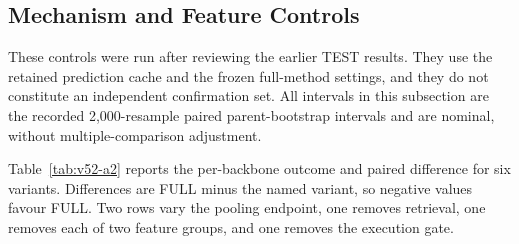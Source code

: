 \documentclass{article}
\begin{document}
\subsection{Mechanism and Feature Controls}
\label{app:estimation-analyses}
These controls were run after reviewing the earlier TEST results. They use the retained
prediction cache and the frozen full-method settings, and they do not constitute an
independent confirmation set. All intervals in this subsection are the recorded
2,000-resample paired parent-bootstrap intervals and are nominal, without
multiple-comparison adjustment.

Table~\ref{tab:v52-a2} reports the per-backbone outcome and paired difference for six
variants. Differences are FULL minus the named variant, so negative values favour FULL.
Two rows vary the pooling endpoint, one removes retrieval, one removes each of two feature
groups, and one removes the execution gate.
\end{document}
